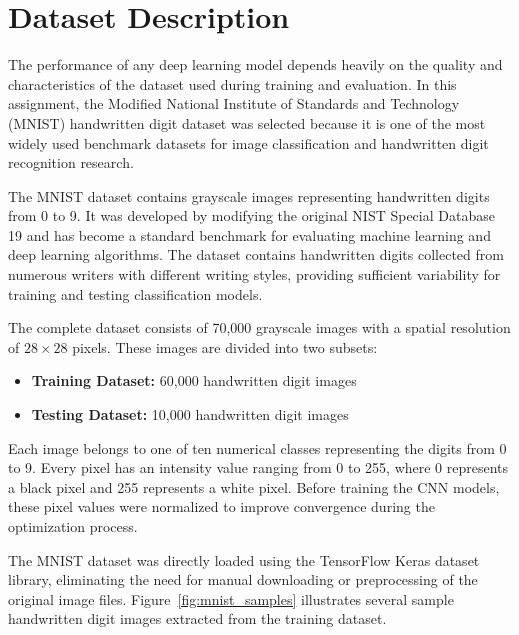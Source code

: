 
\section{Dataset Description}

The performance of any deep learning model depends heavily on the quality and characteristics of the dataset used during training and evaluation. In this assignment, the Modified National Institute of Standards and Technology (MNIST) handwritten digit dataset was selected because it is one of the most widely used benchmark datasets for image classification and handwritten digit recognition research\cite{lecun1998gradient}.

The MNIST dataset contains grayscale images representing handwritten digits from 0 to 9. It was developed by modifying the original NIST Special Database 19 and has become a standard benchmark for evaluating machine learning and deep learning algorithms. The dataset contains handwritten digits collected from numerous writers with different writing styles, providing sufficient variability for training and testing classification models.

The complete dataset consists of 70,000 grayscale images with a spatial resolution of $28 \times 28$ pixels. These images are divided into two subsets:

\begin{itemize}
    \item \textbf{Training Dataset:} 60,000 handwritten digit images
    \item \textbf{Testing Dataset:} 10,000 handwritten digit images
\end{itemize}

Each image belongs to one of ten numerical classes representing the digits from 0 to 9. Every pixel has an intensity value ranging from 0 to 255, where 0 represents a black pixel and 255 represents a white pixel. Before training the CNN models, these pixel values were normalized to improve convergence during the optimization process.

The MNIST dataset was directly loaded using the TensorFlow Keras dataset library, eliminating the need for manual downloading or preprocessing of the original image files. Figure~\ref{fig:mnist_samples} illustrates several sample handwritten digit images extracted from the training dataset.

